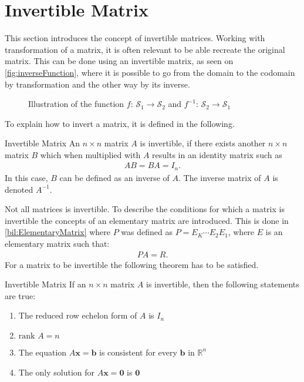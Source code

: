 \section{Invertible Matrix}
This section introduces the concept of invertible matrices. Working with transformation of a matrix, it is often relevant to be able recreate the original matrix. This can be done using an invertible matrix, as seen on \autoref{fig:inverseFunction}, where it is possible to go from the domain to the codomain by transformation and the other way by its inverse. 
\begin{figure}[H]
    \centering
    
    \caption{Illustration of the function $f$: $\mathcal{S}_1 \rightarrow \mathcal{S}_2$ and $f^{-1}$: $\mathcal{S}_2 \rightarrow \mathcal{S}_1$}
    \label{fig:inverseFunction}
\end{figure}
To explain how to invert a matrix, it is defined in the following.
\begin{definition}{Invertible Matrix} \label{def:Invertible}
    An  $n \times n$ matrix $A$ is invertible, if there exists another $n \times n$ matrix $B$ which when multiplied with $A$ results in an identity matrix such as
    \begin{align*}
        AB=BA=I_n.
    \end{align*}
    In this case, $B$ can be defined as an inverse of $A$. The inverse matrix of $A$ is denoted $A^{-1}$. \cite[122]{LiAl}
\end{definition}
Not all matrices is invertible. To describe the conditions for which a matrix is invertible the concepts of an elementary matrix are introduced. This is done in \autoref{bil:ElementaryMatrix} where $P$ was defined as $P=E_K\cdots E_2E_1$, where $E$ is an elementary matrix such that:
\begin{align*}
    PA=R.
\end{align*}
For a matrix to be invertible the following theorem has to be satisfied.
\begin{theorem}{Invertible Matrix}
    \label{the:invertibleMatrix}
    If an $n \times n$ matrix $A$ is invertible, then the following statements are true:
    \begin{enumerate}
        \item The reduced row echelon form of $A$ is $I_n$
        \item $\text{rank } A = n$
        \item The equation $A\mathbf{x}=\mathbf{b}$ is consistent for every $\mathbf{b}$ in $\mathbb{R}^n$
        \item The only solution for $A\mathbf{x}=\mathbf{0}$ is $\mathbf{0}$
    \end{enumerate}
    \cite[138]{LiAl}
\end{theorem}
